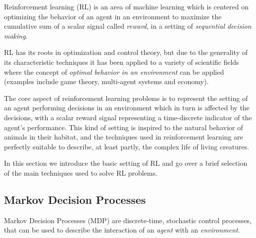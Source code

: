 Reinforcement learning (RL) is an area of machine learning which is centered on 
optimizing the behavior of an agent in an environment to maximize the 
cumulative sum of a scalar signal called \textit{reward}, in a setting
of \textit{sequential decision making}.

RL has its roots in optimization and control theory, but due to the generality 
of its characteristic techniques it has been applied to a variety of scientific 
fields where the concept of \textit{optimal behavior in an environment} can be 
applied (examples include game theory, multi-agent systems and economy).

The core aspect of reinforcement learning problems is to represent the setting
of an agent performing decisions in an environment which in turn is affected by
the decisions, with a scalar reward signal representing a time-discrete 
indicator of the agent's performance. This kind of setting is inspired to the
natural behavior of animals in their habitat, and the techniques used in 
reinforcement learning are perfectly suitable to describe, at least partly, 
the complex life of living creatures. 

In this section we introduce the basic setting of RL and go over a brief 
selection of the main techniques used to solve RL problems. 

\subsection{Markov Decision Processes}
Markov Decision Processes (MDP) are discrete-time, stochastic control 
processes, that can be used to describe the interaction of an \textit{agent} 
with an \textit{environment}.


